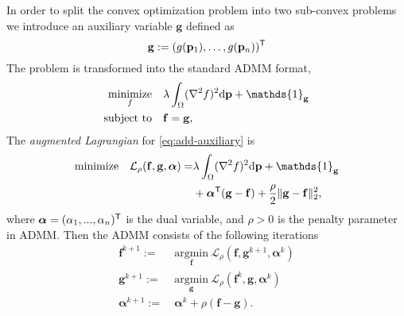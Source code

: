 In order to split the convex optimization problem into two sub-convex problems we introduce an auxiliary variable $\mathbf g$ defined as
\begin{equation}
\mathbf g := (g(\mathbf{p}_1), \dots, g(\mathbf{p}_n))^{\sf T}
\end{equation}
The problem is transformed into the standard ADMM format,
\begin{equation}
\label{eq:add-auxiliary}
\begin{split}
	\underset{f}{\mbox{minimize}} \quad 		
	& \lambda \int_\Omega(\nabla^2 f)^2\ud\mathbf p + \mathds{1}_{\mathbf{g}}\\
	\mbox{subject to} \quad 
	& \mathbf f = \mathbf g,
\end{split}
\end{equation}
The \textit{augmented Lagrangian} for \eqref{eq:add-auxiliary} is
\begin{equation}
\label{eq:aug-Lagrangian}
\begin{split}
	{\mbox{minimize}} \quad
	\mathcal L_{\rho}(\mathbf f, \mathbf g, \boldsymbol{\alpha}) =
	& \lambda\int_\Omega(\nabla^2 f)^2\ud\mathbf p + \mathds{1}_{\mathbf{g}} \\
	& + \boldsymbol{\alpha}^{\sf T} ( \mathbf{g} -  \mathbf{f}) + \frac{\rho}{2} \| \mathbf{g} -  \mathbf{f} \|_{2}^{2},
\end{split}
\end{equation}
where
$\boldsymbol{\alpha} = (\alpha_1, ..., \alpha_n)^{\sf T}$ is the dual variable, and $\rho > 0$ is the penalty parameter in ADMM. Then the ADMM consists of the following iterations
\begin{align}
	\mathbf{f}^{k + 1} := &\ \underset{\mathbf f} {\mbox{argmin}} \ \mathcal L_{\rho} (\mathbf f, \mathbf g^{k+1}, \boldsymbol{\alpha}^k ) \label{eq:ADMM-g-1}\\
	\mathbf{g}^{k + 1} := &\ \underset{\mathbf g} {\mbox{argmin}} \ \mathcal L_{\rho} (\mathbf f^k, \mathbf g, \boldsymbol{\alpha}^k ) \label{eq:ADMM-g-2}\\
	\boldsymbol{\alpha}^{k + 1} := &\ \boldsymbol{\alpha}^{k} + \rho (\mathbf f - \mathbf g). \label{eq:ADMM-g-3}
\end{align}

